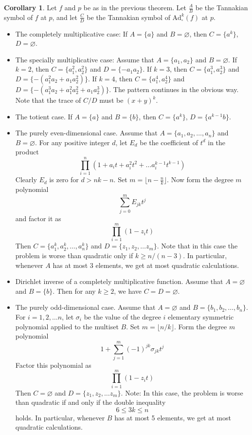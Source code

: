 \documentclass[a4paper]{article}
\theoremstyle{definition}
\newtheorem*{corollary}{Corollary}
\theoremstyle{remark}
\newcommand{\boxadam}[1]{\text{Ad}^{#1}_{\square}}
\begin{document}
\begin{corollary}
Let $f$ and $p$ be as in the previous theorem. Let $\frac{A}{B}$ be the Tannakian symbol of $f$ at $p$, and let $\frac{C}{D}$ be the Tannakian symbol of $\boxadam{k}(f)$ at $p$.
\begin{itemize}
\item The completely multiplicative case: If $A = \{a \}$ and $B = \varnothing$, then $C =  \{a^k \}$, $D = \varnothing$. 
\item The specially multiplicative case: Assume that $A = \{ a_1, a_2 \}$ and $B = \varnothing$. If $k=2$, then $C = \{ a_1^2, a_2^2  \}$ and $D = \{ -a_1 a_2 \}$. If $k=3$, then $C = \{ a_1^3, a_2^3  \}$ and $D = \{ -(a_1^2 a_2 + a_1 a_2^2) \}$. If $k = 4$, then $C = \{ a_1^4, a_2^4  \}$ and $D = \{ -(a_1^3 a_2 + a_1^2 a_2^2 + a_1 a_2^3) \}$. The pattern continues in the obvious way. Note that the trace of $C/D$ must be $(x+y)^k$.
\item The totient case. If $A = \{a \}$ and $B = \{b \}$, then $C =  \{a^k \}$, $D = \{   a^{k-1} b \}$. 

\item The purely even-dimensional case. Assume that $A = \{ a_1, a_2, \ldots, a_n \}$ and $B = \varnothing$. For any positive integer $d$, let $E_d$ be the coefficient of $t^d$ in the product
$$ \prod_{i=1}^n ( 1+a_i t + a_i^2 t^2 + \ldots a_i^{k-1} t^{k-1} )    $$
Clearly $E_d$ is zero for $d > nk-n$. Set $m = \lfloor n- \frac{n}{k} \rfloor$. Now form the degree $m$ polynomial
$$ \sum_{j = 0}^m E_{jk} t^j   $$
and factor it as 
$$ \prod_{i=1}^m (1-z_i t)  $$
Then $C = \{ a_1^k, a_2^k, \ldots, a_n^k \}$ and $D = \{ z_1, z_2, \ldots z_m \}$.
Note that in this case the problem is worse than quadratic only if $k \geq n / (n-3)$. In particular, whenever $A$ has at most 3 elements, we get at most quadratic calculations.

\item Dirichlet inverse of a completely multiplicative function. Assume that $A = \varnothing$ and $B = \{ b \}$. Then for any $k \geq 2$, we have $C = D = \varnothing$.

\item The purely odd-dimensional case. Assume that $A = \varnothing$ and $B = \{ b_1, b_2, \ldots, b_n \}$. For $i = 1, 2, \ldots n$, let $\sigma_i$ be the value of the degree $i$ elementary symmetric polynomial applied to the multiset $B$. Set $m = \lfloor n/k \rfloor$. Form the degree $m$ polynomial 
$$ 1+ \sum_{j=1}^{m} (-1)^{jk} \sigma_{jk} t^j   $$ 
Factor this polynomial as 
$$ \prod_{i=1}^m (1-z_i t)  $$
Then $C = \varnothing$ and $D = \{ z_1, z_2, \ldots z_m  \}$.
Note: In this case, the problem is worse than quadratic if and only if the double inequality
$$ 6 \leq 3k \leq n   $$
holds. In particular, whenever $B$ has at most 5 elements, we get at most quadratic calculations. 
\end{itemize}
\end{corollary}
\end{document}
